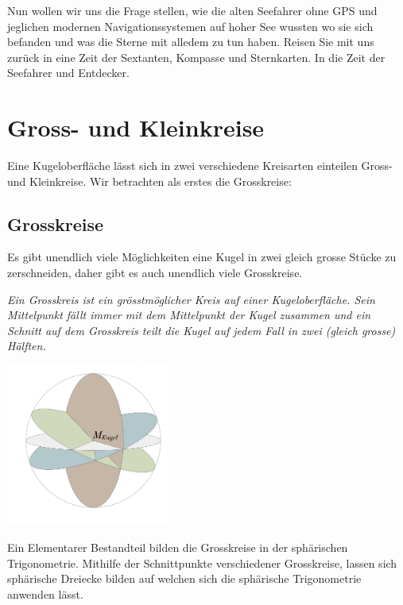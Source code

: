 \begin{refsection}
\begin{refsection}
Nun wollen wir uns die Frage stellen, wie die alten Seefahrer ohne GPS und jeglichen modernen Navigationssystemen auf hoher See wussten wo sie sich befanden und was die Sterne mit alledem zu tun haben. Reisen Sie mit uns zurück in eine Zeit der Sextanten, Kompasse und Sternkarten. In die Zeit der Seefahrer und Entdecker.



\section{Gross- und Kleinkreise}
Eine Kugeloberfläche lässt sich in zwei verschiedene Kreisarten einteilen  Gross- und Kleinkreise. 
Wir betrachten als erstes die Grosskreise:


\subsection{Grosskreise}
Es gibt unendlich viele Möglichkeiten eine Kugel in zwei gleich grosse Stücke zu zerschneiden, daher gibt es auch unendlich viele Grosskreise.

\begin{definition}
\textit{Ein Grosskreis ist ein grösstmöglicher Kreis auf einer Kugeloberfläche. Sein Mittelpunkt fällt immer mit dem Mittelpunkt der Kugel zusammen und ein Schnitt auf dem Grosskreis teilt die Kugel auf jedem Fall in zwei (gleich grosse) Hälften.}
\label{skript:kugel:satz:Grosskreis}
\end{definition}

\begin{center}
        \includegraphics[width=0.4\textwidth]{kugel/_Grosskreis.jpg}
\end{center}

Ein Elementarer Bestandteil bilden die Grosskreise in der sphärischen Trigonometrie. Mithilfe der Schnittpunkte verschiedener Grosskreise, lassen sich sphärische Dreiecke bilden auf welchen sich die sphärische Trigonometrie anwenden lässt. \\


\end{refsection}
\end{refsection}
